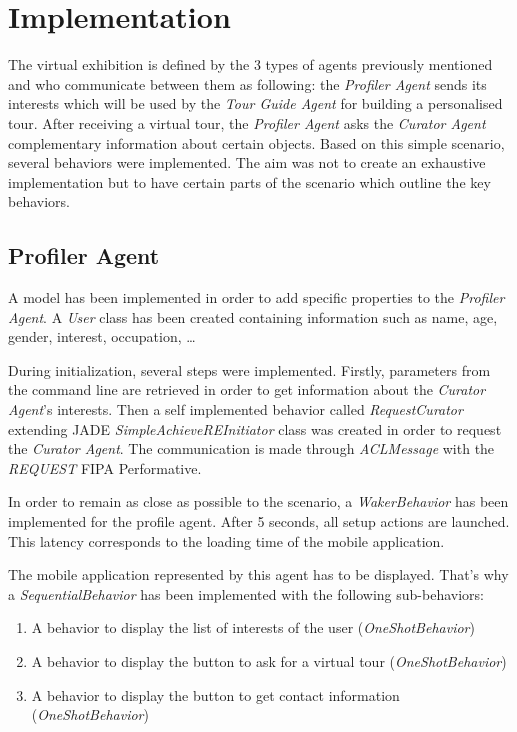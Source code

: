 \documentclass[a4paper,11pt]{article}
\begin{document}
  \newcommand{\pa}{\textit{Profiler Agent}}
  \newcommand{\cu}{\textit{Curator Agent}}
  \renewcommand{\to}{\textit{Tour Guide Agent}}
  
  \section{Implementation}
  
  The virtual exhibition is defined by the 3 types of agents previously mentioned and who communicate between them as following: the \pa{} sends its
  interests which will be used by the \to{} for building a personalised tour. After receiving a virtual tour, the \pa{} asks 
  the \cu{} complementary information about certain objects. Based on this simple scenario, several behaviors were implemented. The aim was not to create an
  exhaustive implementation but to have certain parts of the scenario which outline the key behaviors.
  
  \subsection{Profiler Agent}
  
  A model has been implemented in order to add specific properties to the \pa{}. A \textit{User} class has been created containing information 
  such as name, age, gender, interest, occupation, \dots{}
  
  During initialization, several steps were implemented. Firstly, parameters from the command line are retrieved in order 
  to get information about the \cu{}'s interests. Then a self implemented behavior called \textit{RequestCurator} extending JADE \textit{SimpleAchieveREInitiator} 
  class was created in order to request the \cu{}. The communication is made through \textit{ACLMessage} with the \textit{REQUEST} 
  FIPA Performative.
  
  In order to remain as close as possible to the scenario, a \textit{WakerBehavior} has been implemented for the profile agent. After 5 seconds, 
  all setup actions are launched. This latency corresponds to the loading time of the mobile application.
  
  The mobile application represented by this agent has to be displayed. That's why a \textit{SequentialBehavior} has been implemented with the following 
  sub-behaviors:
  \vspace{-15pt}
  \begin{enumerate}
   \item A behavior to display the list of interests of the user (\textit{OneShotBehavior})
   \item A behavior to display the button to ask for a virtual tour (\textit{OneShotBehavior})
   \item A behavior to display the button to get contact information (\textit{OneShotBehavior})
  \end{enumerate}
  
\end{document}

